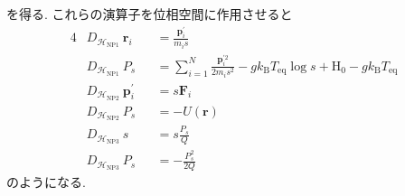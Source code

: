 を得る.
これらの演算子を位相空間に作用させると
\begin{alignat}{4}
  &D_{\mathcal{H}_{\mathrm{NP1}}} ~ \bm{r}_{i}
  &&=
  \frac{\bm{p}_{i}^{\prime}}{m_{i}s}
  \label{Eq:Liouville-NP1-r} \\
  &D_{\mathcal{H}_{\mathrm{NP1}}} ~ P_{s}
  &&=
  \sum_{i=1}^{N}
  \frac{\bm{p}_{i}^{\prime 2}}{2m_{i}s^{2}}
  -
  g k_{\mathrm{B}} T_{\mathrm{eq}} \log s
  +
  \mathrm{H}_{0}
  -
  g k_{\mathrm{B}} T_{\mathrm{eq}}
  \label{Eq:Liouville-NP1-s} \\
  &D_{\mathcal{H}_{\mathrm{NP2}}} ~ \bm{p}_{i}^{\prime}
  &&=
  s \bm{F}_{i}
  \label{Eq:Liouville-NP2-p} \\
  &D_{\mathcal{H}_{\mathrm{NP2}}} ~ P_{s}
  &&=
  -U(\bm{r})
  \label{Eq:Liouville-NP2-Ps} \\
  &D_{\mathcal{H}_{\mathrm{NP3}}} ~ s
  &&=
  s \frac{P_{s}}{Q}
  \label{Eq:Liouville-NP3-s} \\
  &D_{\mathcal{H}_{\mathrm{NP3}}} ~ P_{s}
  &&=
  -\frac{P_{s}^{2}}{2Q}
  \label{Eq:Liouville-NP3P-s}
\end{alignat}
のようになる.

